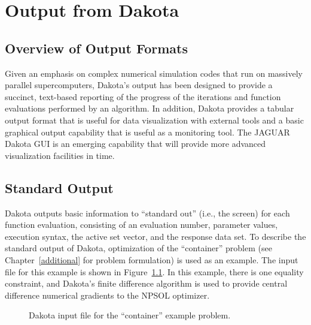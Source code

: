 \chapter{Output from Dakota}\label{output}

\section{Overview of Output Formats}\label{output:overview}

Given an emphasis on complex numerical simulation codes that run on
massively parallel supercomputers, Dakota's output has been designed
to provide a succinct, text-based reporting of the progress of the
iterations and function evaluations performed by an algorithm. In
addition, Dakota provides a tabular output format that is useful for
data visualization with external tools and a basic graphical output
capability that is useful as a monitoring tool. The JAGUAR Dakota GUI
is an emerging capability that will provide more advanced
visualization facilities in time.

\section{Standard Output}\label{output:standard}

Dakota outputs basic information to ``standard out'' (i.e., the
screen) for each function evaluation, consisting of an evaluation
number, parameter values, execution syntax, the active set vector, and
the response data set. To describe the standard output of Dakota,
optimization of the ``container'' problem (see
Chapter~\ref{additional} for problem formulation) is used as an
example. The input file for this example is shown in
Figure~\ref{output:incont}. In this example, there is one equality
constraint, and Dakota's finite difference algorithm is used to
provide central difference numerical gradients to the NPSOL optimizer.
\begin{figure}
  \begin{small}
    \begin{bigbox}
    \end{bigbox}
  \end{small}
  \caption{Dakota input file for the ``container'' example problem.}
  \label{output:incont}
\end{figure}

\clearpage

